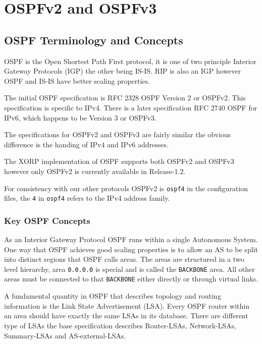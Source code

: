 %
% 

\chapter{OSPFv2 and OSPFv3}
\label{ospf}
\section{OSPF Terminology and Concepts}

OSPF is the Open Shortest Path First protocol, it is one of two
principle Interior Gateway Protocols (IGP) the other being IS-IS. RIP
is also an IGP however OSPF and IS-IS have better scaling properties.

The initial OSPF specification is RFC 2328 OSPF Version 2 or
OSPFv2. This specification is specific to IPv4. There is a later
specification RFC 2740 OSPF for IPv6, which happens to be Version 3 or
OSPFv3.

The specifications for OSPFv2 and OSPFv3 are fairly similar the
obvious difference is the handing of IPv4 and IPv6 addresses.

The XORP implementation of OSPF supports both OSPFv2 and OSPFv3
however only OSPFv2 is currently available in Release-1.2.

For consistency with our other protocols OSPFv2 is {\tt ospf4} in the
configuration files, the {\tt 4} in {\tt ospf4} refers to the IPv4
address family.

\subsection{Key OSPF Concepts}

As an Interior Gateway Protocol OSPF runs within a single Autonomous
System. One way that OSPF achieves good scaling properties is to allow
an AS to be split into distinct regions that OSPF calls areas. The areas
are structured in a two level hierarchy, area {\tt 0.0.0.0} is special
and is called the {\tt BACKBONE} area. All other areas must be
connected to that {\tt BACKBONE} either directly or through virtual links.

A fundamental quantity in OSPF that describes topology and routing
information is the Link State Advertisement (LSA). Every OSPF router
within an area should have exactly the same LSAs in its
database. There are different type of LSAs the base specification
describes Router-LSAs, Network-LSAs, Summary-LSAs and AS-external-LSAs.

